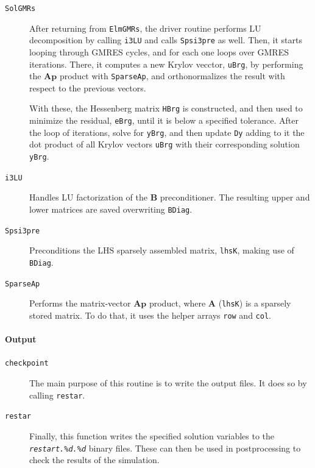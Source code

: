 \documentclass{ucb}
\begin{document}
\begin{description}

    \item[\texttt{SolGMRs}] After returning from \texttt{ElmGMRs}, the driver routine performs LU decomposition by calling \texttt{i3LU} and calls \texttt{Spsi3pre} as well. Then, it starts looping through GMRES cycles, and for each one loops over GMRES iterations. There, it computes a new Krylov vecctor, \texttt{uBrg}, by performing the $\bm{A}\bm{p}$ product with \texttt{SparseAp}, and orthonormalizes the result with respect to the previous vectors.
    
    With these, the Hessenberg matrix \texttt{HBrg} is constructed, and then used to minimize the residual, \texttt{eBrg}, until it is below a specified tolerance. After the loop of iterations, solve for \texttt{yBrg}, and then update \texttt{Dy} adding to it the dot product of all Krylov vectors \texttt{uBrg} with their corresponding solution \texttt{yBrg}.
        
    \item[\texttt{i3LU}] Handles LU factorization of the $\bm{B}$ preconditioner. The resulting upper and lower matrices are saved overwriting \texttt{BDiag}.
    
    \item[\texttt{Spsi3pre}] Preconditions the LHS sparsely assembled matrix, \texttt{lhsK}, making use of \texttt{BDiag}.
    
    \item[\texttt{SparseAp}] Performs the matrix-vector $\bm{A}\bm{p}$ product, where $\bm{A}$ (\texttt{lhsK}) is a sparsely stored matrix. To do that, it uses the helper arrays \texttt{row} and \texttt{col}.

\end{description}

\pagebreak

\paragraph{Output}

\begin{description}

    \item[\texttt{checkpoint}] The main purpose of this routine is to write the output files. It does so by calling \texttt{restar}.
    
    \item[\texttt{restar}] Finally, this function writes the specified solution variables to the \texttt{\textit{restart.\%d.\%d}} binary files. These can then be used in postprocessing to check the results of the simulation.

\end{description}
\end{document}
